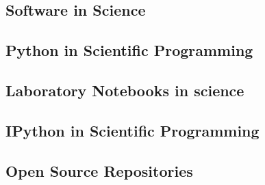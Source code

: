 \subsection{Software in Science}

\subsection{Python in Scientific Programming}


\subsection{Laboratory Notebooks in science}


\subsection{IPython in Scientific Programming}



\subsection{Open Source Repositories}
